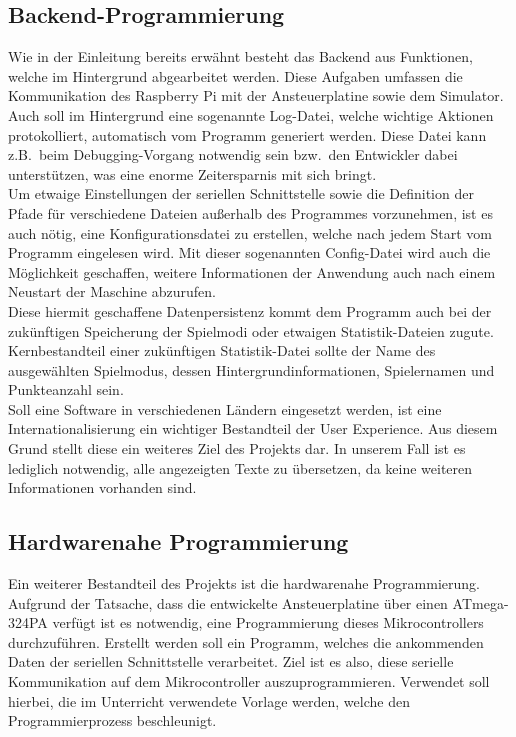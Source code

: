\subsection{Backend-Programmierung}\label{subsec:backend-programmierung}
Wie in der Einleitung bereits erwähnt besteht das Backend aus Funktionen, welche im Hintergrund abgearbeitet werden.
Diese Aufgaben umfassen die Kommunikation des Raspberry Pi mit der Ansteuerplatine sowie dem Simulator.\\
Auch soll im Hintergrund eine sogenannte Log-Datei, welche wichtige Aktionen protokolliert, automatisch vom Programm generiert werden.
Diese Datei kann z.B.\ beim Debugging-Vorgang notwendig sein bzw.\ den Entwickler dabei unterstützen, was eine enorme Zeitersparnis mit sich bringt.\\
Um etwaige Einstellungen der seriellen Schnittstelle sowie die Definition der Pfade für verschiedene Dateien außerhalb des Programmes vorzunehmen, ist es auch nötig, eine Konfigurationsdatei zu erstellen, welche nach jedem Start vom Programm eingelesen wird.
Mit dieser sogenannten \acs{Config}-Datei wird auch die Möglichkeit geschaffen, weitere Informationen der Anwendung auch nach einem Neustart der Maschine abzurufen.\\
Diese hiermit geschaffene Datenpersistenz kommt dem Programm auch bei der zukünftigen Speicherung der Spielmodi oder etwaigen Statistik-Dateien zugute.
Kernbestandteil einer zukünftigen Statistik-Datei sollte der Name des ausgewählten Spielmodus, dessen Hintergrundinformationen, Spielernamen und Punkteanzahl sein.\\
Soll eine Software in verschiedenen Ländern eingesetzt werden, ist eine Internationalisierung ein wichtiger Bestandteil der User Experience.
Aus diesem Grund stellt diese ein weiteres Ziel des Projekts dar.
In unserem Fall ist es lediglich notwendig, alle angezeigten Texte zu übersetzen, da keine weiteren Informationen vorhanden sind.

\subsection{Hardwarenahe Programmierung}\label{subsec:hardwarenahe-programmierung}
Ein weiterer Bestandteil des Projekts ist die hardwarenahe Programmierung.
Aufgrund der Tatsache, dass die entwickelte Ansteuerplatine über einen ATmega-324PA verfügt ist es notwendig, eine Programmierung dieses Mikrocontrollers durchzuführen.
Erstellt werden soll ein Programm, welches die ankommenden Daten der seriellen Schnittstelle verarbeitet.
Ziel ist es also, diese serielle Kommunikation auf dem Mikrocontroller auszuprogrammieren.
Verwendet soll hierbei, die im Unterricht verwendete Vorlage werden, welche den Programmierprozess beschleunigt.
\newpage
